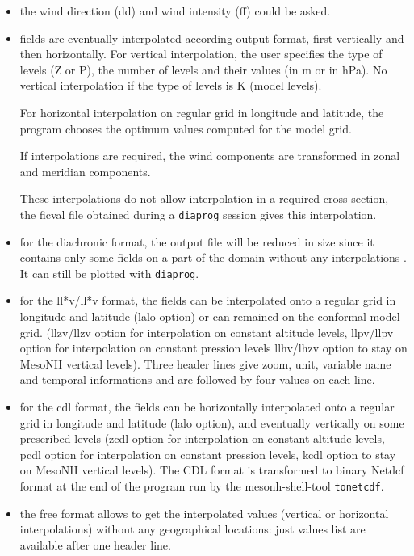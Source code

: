 \begin{itemize}
\item the wind direction (dd) and wind intensity (ff) could be asked.
\item fields are eventually interpolated according output format,
first vertically and then horizontally.
For vertical interpolation, the user specifies the type of levels (Z or P), 
the number of levels and their values (in m or in hPa). No vertical interpolation if the type of levels is K (model levels).

For horizontal interpolation on regular grid in longitude and latitude, the program chooses the optimum values computed for the model grid. 

If interpolations are required, the wind components are transformed in zonal and meridian components.

These interpolations do not allow interpolation in a required cross-section, the {\sc ficval} file obtained during a {\tt diaprog} session gives this interpolation.
\item for the {\sc diac}hronic format, the output file will be reduced in size
since it contains only some fields on a part of the domain without any interpolations .
It can still be plotted with {\tt diaprog}.
\item for the {\sc ll*v}/ll*v format, the fields can be interpolated onto a 
regular grid in longitude and latitude ({\sc lalo} option) or can remained on 
the conformal model grid.
({\sc llzv}/llzv option for interpolation on constant altitude levels,
{\sc llpv}/llpv option for interpolation on constant pression levels
{\sc llhv}/lhzv option to stay on MesoNH vertical levels).
Three header lines give zoom, unit, variable name and temporal informations and
are followed by four values on each line.
\item for the {\sc cdl} format, the fields can be horizontally interpolated
onto a regular grid in longitude and latitude ({\sc lalo} option),
and eventually vertically on some prescribed levels 
({\sc zcdl} option for interpolation on constant altitude levels,
{\sc pcdl} option for interpolation on constant pression levels,
{\sc kcdl} option to stay on MesoNH vertical levels).
The CDL format is transformed to binary Netdcf format at the end of the program run by the mesonh-shell-tool \texttt{tonetcdf}.
\item the {\sc free} format allows to get the interpolated values (vertical or horizontal interpolations) without any geographical locations: just values list are available after one header line.
\end{itemize}



